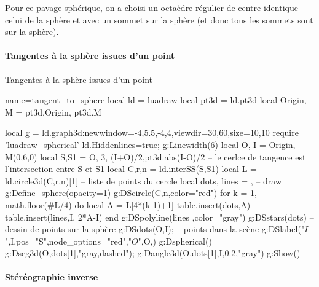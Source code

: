 Pour ce pavage sphérique, on a choisi un octaèdre régulier de centre identique celui de la sphère et avec un sommet sur la sphère (et donc tous les sommets sont sur la sphère).

\paragraph{Tangentes à la sphère issues d'un point}

\begin{demo}{Tangentes à la sphère issues d'un point}
\begin{luadraw}{name=tangent_to_sphere}
local ld = luadraw
local pt3d = ld.pt3d
local Origin, M = pt3d.Origin, pt3d.M

local g = ld.graph3d:new{window={-4,5.5,-4,4},viewdir={30,60},size={10,10}}
require 'luadraw_spherical'
ld.Hiddenlines=true; g:Linewidth(6)
local O, I = Origin, M(0,6,0)
local S,S1 = {O, 3}, {(I+O)/2,pt3d.abs(I-O)/2}
-- le cerlce de tangence est l'intersection entre S et S1
local C,r,n = ld.interSS(S,S1) 
local L = ld.circle3d(C,r,n)[1] -- liste de points du cercle
local dots, lines = {}, {}
-- draw
g:Define_sphere({opacity=1})
g:DScircle({C,n},{color="red"})
for k = 1, math.floor(#L/4) do
    local A = L[4*(k-1)+1]
    table.insert(dots,A)
    table.insert(lines,{I, 2*A-I})
end
g:DSpolyline(lines ,{color="gray"})
g:DSstars(dots) -- dessin de points sur la sphère
g:DSdots({O,I});  -- points dans la scène
g:DSlabel("$I$",I,{pos="S",node_options="red"},"$O$",O,{})
g:Dspherical()
g:Dseg3d({O,dots[1]},"gray,dashed"); g:Dangle3d(O,dots[1],I,0.2,"gray")
g:Show() 
\end{luadraw}
\end{demo}

\paragraph{Stéréographie inverse}

